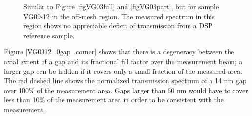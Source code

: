 \begin{figure}[htbp]
    \centering
    \newline
	\caption[We can constain interfacial gap axial extents to $<$14 nm]{Similar to Figure \ref{figVG03full} and \ref{figVG03part}, but for sample VG09-12 in the off-mesh region.  The measured spectrum in this region shows no appreciable deficit of transmission from a DSP reference sample.
	\label{figVG12-STA}}
\end{figure}

Figure \ref{VG0912_0gap_corner} shows that there is a degeneracy between the axial extent of a gap and its fractional fill factor over the measurement beam; a larger gap can be hidden if it covers only a small fraction of the measured area.  The red dashed line shows the normalized transmission spectrum of a 14 nm gap over 100\% of the measurement area.  Gaps larger than 60 nm would have to cover less than 10\% of the measurement area in order to be consistent with the measurement.



